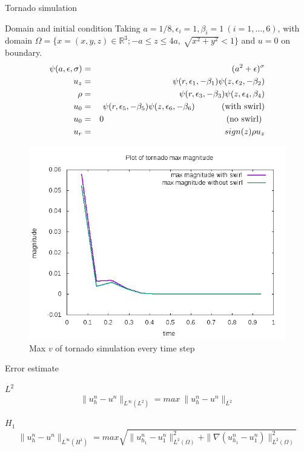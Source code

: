 \documentclass{beamer}
\newcommand{\R}{\mathbb{R}}
\begin{document}
\begin{frame}{Tornado simulation}
	\begin{block}{Domain and initial condition}
		Taking $ a=1/8, \epsilon_{i} =1, \beta_{i}=1 \ (i=1,\dots,6) $, with domain $ \Omega = \{ x=(x,y,z) \in \R^3 ; -a\leq z\leq 4a, \ \sqrt{x^2+y^2}<1 \} $ and $ u=0 $ on boundary.
		\begin{eqnarray}\nonumber
		\psi(a,\epsilon,\sigma) &=& (a^{2}+\epsilon)^{\sigma}\\ \nonumber
		u_{z} &=& \psi(r,\epsilon_{1},-\beta_{1})\psi(z,\epsilon_{2},-\beta_{2})\\ \nonumber
		\rho &=& \psi(r,\epsilon_{3},-\beta_{3})\psi(z,\epsilon_{4},\beta_{4})\\ \nonumber
		u_{0} &=& \psi(r,\epsilon_{5},-\beta_{5})\psi(z,\epsilon_{6},-\beta_{6}) \text{\hspace{1cm} (with swirl)}\\ \nonumber
		u_{0} &=& 0 \text{ \hspace{5cm}(no swirl) }\\ \nonumber
		u_{r} &=& sign(z)\rho u_{z}
		\end{eqnarray}
	\end{block}
\end{frame}

\begin{frame}
\begin{figure}
	\centering
	\includegraphics[width=1\linewidth]{NS_3D/magnitude_tornado}
	\caption{Max $ v $ of tornado simulation every time step}
	\label{fig:magnitudetornado}
\end{figure}

\end{frame}

\begin{frame}{Error estimate}
\begin{block}{$ L^{2} $}
	\[\| u_{h}^{n}-u^{n} \|_{L^\infty(L^2)} =  max \ \| u_{h}^{n}-u^{n} \|_{L^{2}}\]
\end{block}
\begin{block}{$ H_{1} $}
	\[\| u_{h}^{n}-u^{n} \|_{L^\infty(H^{1})} = max \sqrt{\| u_{h_{1}}^{n}-u_{1}^{n} \|_{L^2(\Omega)}^{2} + \| \nabla (u_{h_{1}}^{n}-u_{1}^{n}) \|_{L^2(\Omega)}^{2}}\]
\end{block}
\end{frame}
\end{document}
